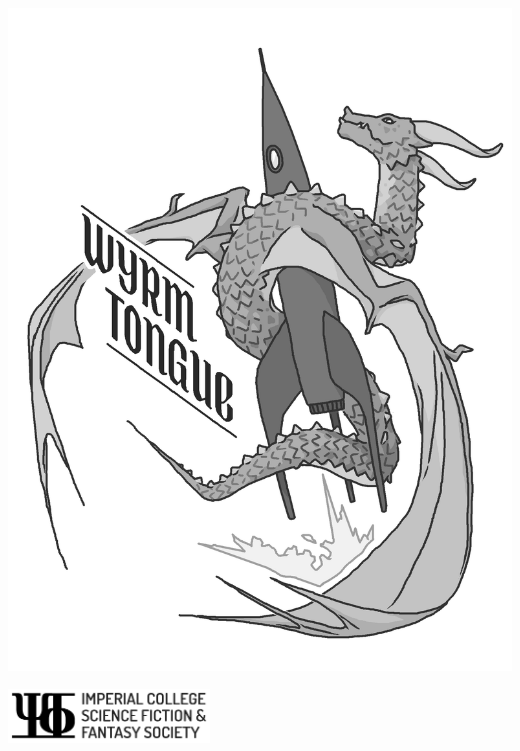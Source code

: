 \thispagestyle{empty}
\includegraphics[width=\textwidth]{img/cover.png}
\par\vspace{\fill}
\begin{center}
  \includegraphics[width=0.4\textwidth]{img/logo/logo-alt.png}
\end{center}
